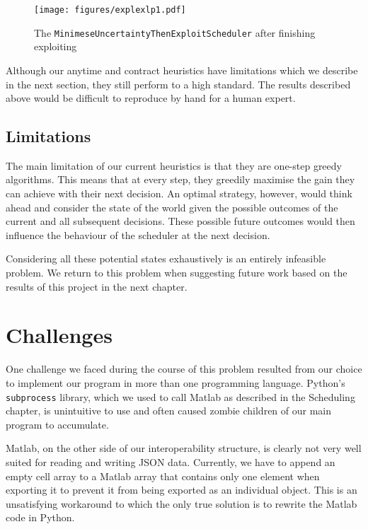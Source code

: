 \documentclass[a4paper,12pt,twoside,openright]{report}
\begin{document}
\begin{figure}
\centering
  \texttt{[image: figures/explexlp1.pdf]}
  \caption{The \texttt{MinimeseUncertaintyThenExploitScheduler} after finishing exploiting}
  \label{explexlp1}
\end{figure}



Although our anytime and contract heuristics have limitations which we describe in the next section, they still perform to a high standard. The results described above would be difficult to reproduce by hand for a human expert.

\subsection{Limitations}
The main limitation of our current heuristics is that they are one-step greedy algorithms. This means that at every step, they greedily maximise the gain they can achieve with their next decision. An optimal strategy, however, would think ahead and consider the state of the world given the possible outcomes of the current and all subsequent decisions. These possible future outcomes would then influence the behaviour of the scheduler at the next decision. 


Considering all these potential states exhaustively is an entirely infeasible problem. We return to this problem when suggesting future work based on the results of this project in the next chapter.



\section{Challenges}
One challenge we faced during the course of this problem resulted from our choice to implement our program in more than one programming language. Python's \texttt{subprocess} library, which we used to call Matlab as described in the Scheduling chapter, is unintuitive to use and often caused zombie children of our main program to accumulate. 

Matlab, on the other side of our interoperability structure, is clearly not very well suited for reading and writing JSON data. Currently, we have to append an empty cell array to a Matlab array that contains only one element when exporting it to prevent it from being exported as an individual object. This is an unsatisfying workaround to which the only true solution is to rewrite the Matlab code in Python.
\end{document}
